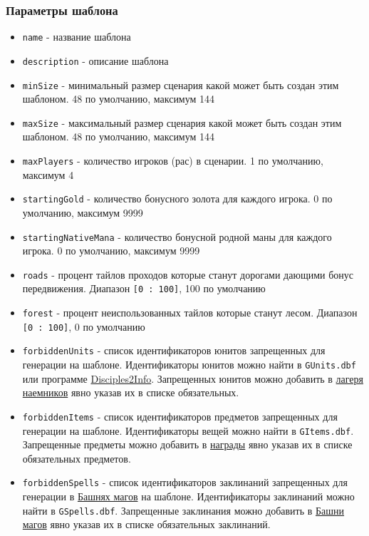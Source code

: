 \subsubsection{Параметры шаблона}
\begin{itemize}
\item \texttt{name} - название шаблона
\item \texttt{description} - описание шаблона
\item \texttt{minSize} - минимальный размер сценария какой может быть создан этим шаблоном. 48 по умолчанию, максимум 144
\item \texttt{maxSize} - максимальный размер сценария какой может быть создан этим шаблоном. 48 по умолчанию, максимум 144
\item \texttt{maxPlayers} - количество игроков (рас) в сценарии. 1 по умолчанию, максимум 4
\item \texttt{startingGold} - количество бонусного золота для каждого игрока. 0 по умолчанию, максимум 9999
\item \texttt{startingNativeMana} - количество бонусной родной маны для каждого игрока. 0 по умолчанию, максимум 9999
\item \texttt{roads} - процент тайлов проходов которые станут дорогами дающими бонус передвижения. Диапазон \texttt{[0 : 100]}, 100 по умолчанию
\item \texttt{forest} - процент неиспользованных тайлов которые станут лесом. Диапазон \texttt{[0 : 100]}, 0 по умолчанию

\item \texttt{forbiddenUnits} - список идентификаторов юнитов запрещенных для генерации на шаблоне.
Идентификаторы юнитов можно найти в \texttt{GUnits.dbf} или программе
\href{https://drive.google.com/file/d/1hI7OYhoQbeizglwZwY8UuWSSr6Q1i6WO/view}{Disciples2Info}.
Запрещенных юнитов можно добавить в \hyperref[mercenary]{лагеря наемников} явно указав их в списке обязательных.

\item \texttt{forbiddenItems} - список идентификаторов предметов запрещенных для генерации на шаблоне.
Идентификаторы вещей можно найти в \texttt{GItems.dbf}.
Запрещенные предметы можно добавить в \hyperref[loot]{награды} явно указав их в списке обязательных предметов.

\item \texttt{forbiddenSpells} - список идентификаторов заклинаний запрещенных для генерации в \hyperref[mage]{Башнях магов} на шаблоне.
Идентификаторы заклинаний можно найти в \texttt{GSpells.dbf}.
Запрещенные заклинания можно добавить в \hyperref[mage]{Башни магов} явно указав их в списке обязательных заклинаний.


\end{itemize}
